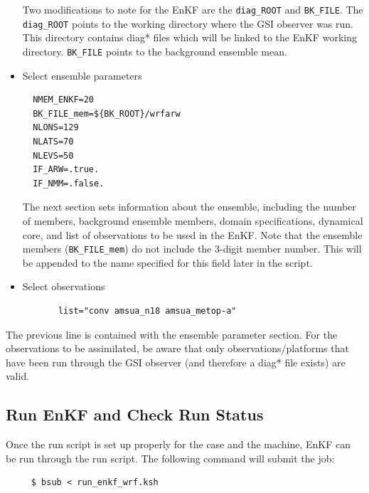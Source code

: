 \begin{itemize}
Two modifications to note for the EnKF are the \verb|diag_ROOT| and \verb|BK_FILE|. The \verb|diag_ROOT| points to the working directory where the GSI observer was run. This directory contains diag* files which will be linked to the EnKF working directory. \verb|BK_FILE| points to the background ensemble mean.\\

\item Select ensemble parameters

\begin{footnotesize}
\begin{verbatim}
  NMEM_ENKF=20
  BK_FILE_mem=${BK_ROOT}/wrfarw
  NLONS=129
  NLATS=70
  NLEVS=50
  IF_ARW=.true.
  IF_NMM=.false.
\end{verbatim}
\end{footnotesize}

The next section sets information about the ensemble, including the number of members, background ensemble members, domain specifications, dynamical core, and list of observations to be used in the EnKF. Note that the ensemble members (\verb|BK_FILE_mem|) do not include the 3-digit member number. This will be appended to the name specified for this field later in the script.\\

\item Select observations
\begin{verbatim}
       list="conv amsua_n18 amsua_metop-a"
\end{verbatim}
\end{itemize}
The previous line is contained with the ensemble parameter section. For the observations to be assimilated, be aware that only observations/platforms that have been run through the GSI observer (and therefore a diag* file exists) are valid.

\subsection{Run EnKF and Check Run Status}

Once the run script is set up properly for the case and the machine, EnKF can be run through the run script. The following command will submit the job:
\begin{small}
\begin{verbatim}
     $ bsub < run_enkf_wrf.ksh
\end{verbatim}
\end{small}

